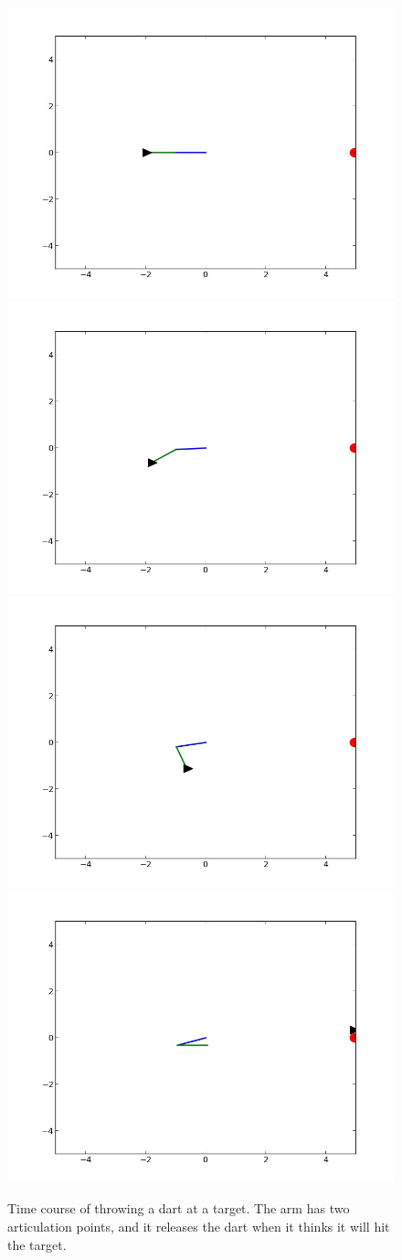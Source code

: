 \documentclass{article}
\theoremstyle{definition}
\begin{document}
\begin{figure}
\includegraphics[width=0.5\linewidth]{darts-traj/frame1.png}
\includegraphics[width=0.5\linewidth]{darts-traj/frame2.png}
\includegraphics[width=0.5\linewidth]{darts-traj/frame3.png}
\includegraphics[width=0.5\linewidth]{darts-traj/frame4.png}
\caption{Time course of throwing a dart at a target. The arm has two
  articulation points, and it releases the dart when it thinks it will
  hit the target.}
\label{fig-darts1}
\end{figure}
\end{document}
